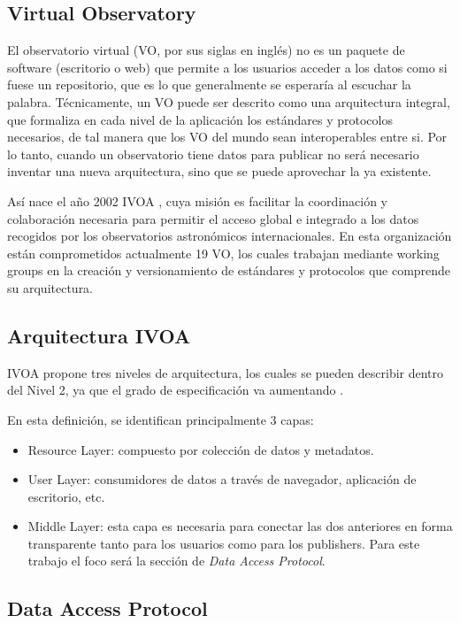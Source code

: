 \subsection{Virtual Observatory}
El observatorio virtual (VO, por sus siglas en inglés) no es un paquete de
software (escritorio o web) que permite a los usuarios acceder a los datos como
si fuese un repositorio, que es lo que generalmente se esperaría al escuchar la
palabra. Técnicamente, un VO puede ser descrito como una arquitectura integral,
que formaliza en cada nivel de la aplicación los estándares y protocolos
necesarios, de tal manera que los VO del mundo sean interoperables entre si.
Por lo tanto, cuando un observatorio tiene datos para publicar no será
necesario inventar una nueva arquitectura, sino que se puede aprovechar la ya
existente.

Así nace el año 2002 IVOA \cite{ivoa}, cuya misión es facilitar
la coordinación y colaboración necesaria para permitir el acceso global e
integrado a los datos recogidos por los observatorios astronómicos
internacionales. En esta organización están comprometidos actualmente 19 VO,
los cuales trabajan mediante working groups en la creación y versionamiento de
estándares y protocolos que comprende su arquitectura.




\subsection{Arquitectura IVOA}

IVOA propone tres niveles de arquitectura, los cuales se pueden describir
dentro del Nivel 2, ya que el grado de especificación va aumentando \cite{arch}.

En esta definición, se identifican principalmente 3 capas:
\begin{itemize}
	\item Resource Layer: compuesto por colección de datos y metadatos.
	\item User Layer: consumidores de datos a través de navegador,
aplicación de escritorio, etc.
	\item Middle Layer: esta capa es necesaria para conectar las dos
anteriores en forma transparente tanto para los usuarios como para los
publishers. Para este trabajo el foco será la sección de \emph{Data Access Protocol}.
\end{itemize}

\subsection{Data Access Protocol}

